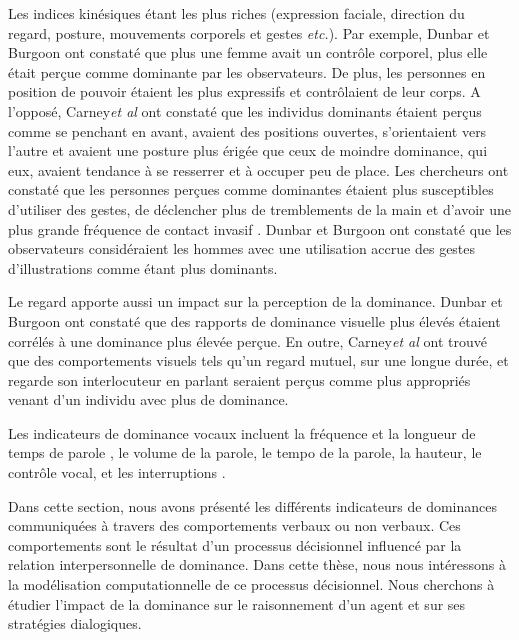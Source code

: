 			 Les indices kinésiques étant les plus riches (expression faciale, direction du regard, posture, mouvements corporels et gestes \emph{etc.}).
			Par exemple, Dunbar et Burgoon \cite{dunbar2005perceptions} ont constaté que plus une femme avait un contrôle corporel, plus elle était perçue comme dominante par les observateurs. De plus, les personnes en position de pouvoir  étaient les plus expressifs et  contrôlaient de leur corps.
			A l'opposé,  Carney\emph{et al}\cite{hall2005nonverbal} ont constaté que les individus dominants étaient perçus comme se penchant en avant, avaient des positions ouvertes, s'orientaient vers l'autre et avaient une posture plus érigée que ceux de moindre dominance, qui eux, avaient tendance à se resserrer et à occuper peu de place. Les chercheurs ont constaté que les personnes perçues comme dominantes étaient plus susceptibles d'utiliser des gestes, de déclencher plus de tremblements de la main et d'avoir une plus grande fréquence de contact invasif \cite{hall2005nonverbal}.
			 Dunbar et Burgoon \cite{dunbar2005perceptions} ont constaté que les observateurs considéraient les hommes avec une utilisation accrue des gestes d'illustrations comme étant plus dominants.
			
			Le regard apporte aussi un impact sur la perception de la dominance. Dunbar et Burgoon \cite{dunbar2005perceptions} ont constaté que des rapports de dominance visuelle plus élevés étaient corrélés à une dominance plus élevée perçue. En outre, Carney\emph{et al} \cite{hall2005nonverbal} ont trouvé que des comportements visuels tels qu'un regard mutuel, sur une longue durée, et regarde son interlocuteur en parlant seraient perçus comme plus appropriés venant d'un individu avec plus de dominance.
			
			Les indicateurs de dominance vocaux incluent la fréquence et la longueur de temps de parole \cite{mast2002dominance}, le volume de la parole, le tempo de la parole, la hauteur, le contrôle vocal, et les interruptions \cite{dunbar2005perceptions}.
		
		Dans cette section, nous avons présenté les différents indicateurs de dominances communiquées à travers des comportements verbaux ou non verbaux. Ces comportements sont le résultat d'un processus décisionnel influencé par la relation interpersonnelle de dominance. Dans cette thèse, nous nous intéressons à la modélisation computationnelle de ce processus décisionnel. Nous cherchons à étudier l'impact de la dominance sur le raisonnement d'un agent et sur ses stratégies dialogiques. 
		
